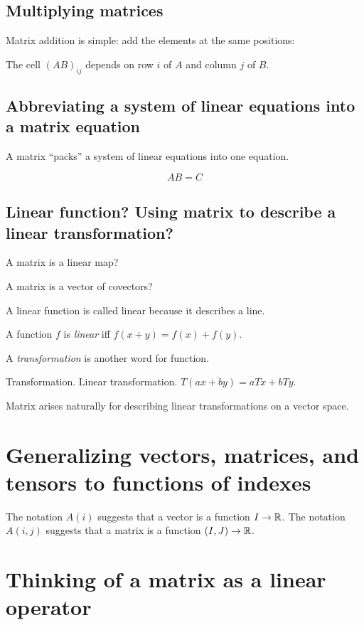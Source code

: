 \subsection{Multiplying matrices}

Matrix addition is simple:
add the elements at the same positions:

The cell \((AB)_{ij}\) depends on row \(i\) of \(A\) and column \(j\) of \(B\).

\subsection{Abbreviating a system of linear equations into a matrix equation}

A matrix \enquote{packs} a system of linear equations into one equation.

\[ AB = C \]

\subsection{Linear function? Using matrix to describe a linear transformation?}

A matrix is a linear map?

A matrix is a vector of covectors?

A linear function is called linear because it describes a line.

A function \(f\) is \emph{linear} iff \( f(x+y) = f(x) + f(y) \).

A \emph{transformation} is another word for function.

Transformation.
Linear transformation.
$T(ax+by) = aTx + bTy$.

Matrix arises naturally for describing linear transformations on a vector space.

\section{Generalizing vectors, matrices, and tensors to functions of indexes}

The notation \(A(i)\) suggests that a vector is a function \( I \to \mathbb{R} \).
The notation \(A(i,j)\) suggests that a matrix is a function \( (I,J) \to \mathbb{R} \).

\section{Thinking of a matrix as a linear operator}

